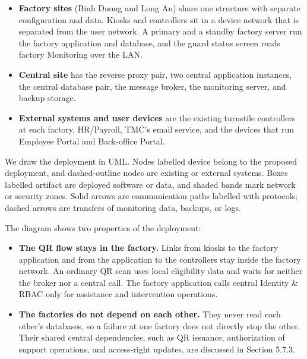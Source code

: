 \begin{itemize}[leftmargin=36pt, itemsep=2pt, topsep=4pt, parsep=2pt]
  \item \textbf{Factory sites} (Binh Duong and Long An) share one structure with separate configuration and data. Kiosks and controllers sit in a device network that is separated from the user network. A primary and a standby factory server run the factory application and database, and the guard status screen reads factory Monitoring over the LAN.
  \item \textbf{Central site} has the reverse proxy pair, two central application instances, the central database pair, the message broker, the monitoring server, and backup storage.
  \item \textbf{External systems and user devices} are the existing turnstile controllers at each factory, HR/Payroll, TMC's email service, and the devices that run Employee Portal and Back-office Portal.
\end{itemize}

We draw the deployment in UML. Nodes labelled \guillemotleft device\guillemotright{} belong to the proposed deployment, and dashed-outline nodes are existing or external systems. Boxes labelled \guillemotleft artifact\guillemotright{} are deployed software or data, and shaded bands mark network or security zones. Solid arrows are communication paths labelled with protocols; dashed arrows are transfers of monitoring data, backups, or logs.

The diagram shows two properties of the deployment:

\begin{itemize}[leftmargin=36pt, itemsep=2pt, topsep=4pt, parsep=2pt]
  \item \textbf{The QR flow stays in the factory.} Links from kiosks to the factory application and from the application to the controllers stay inside the factory network. An ordinary QR scan uses local eligibility data and waits for neither the broker nor a central call. The factory application calls central Identity \& RBAC only for assistance and intervention operations.
  \item \textbf{The factories do not depend on each other.} They never read each other's databases, so a failure at one factory does not directly stop the other. Their shared central dependencies, such as QR issuance, authorization of support operations, and access-right updates, are discussed in Section 5.7.3.
\end{itemize}


